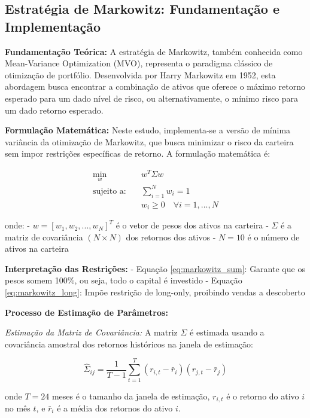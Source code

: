 \subsection{Estratégia de Markowitz: Fundamentação e Implementação}

\textbf{Fundamentação Teórica:} A estratégia de Markowitz, também conhecida como Mean-Variance Optimization (MVO), representa o paradigma clássico de otimização de portfólio. Desenvolvida por Harry Markowitz em 1952, esta abordagem busca encontrar a combinação de ativos que oferece o máximo retorno esperado para um dado nível de risco, ou alternativamente, o mínimo risco para um dado retorno esperado.

\textbf{Formulação Matemática:} Neste estudo, implementa-se a versão de mínima variância da otimização de Markowitz, que busca minimizar o risco da carteira sem impor restrições específicas de retorno. A formulação matemática é:

\begin{align}
\min_{w} \quad & w^T \Sigma w \label{eq:markowitz_obj} \\
\text{sujeito a:} \quad & \sum_{i=1}^{N} w_i = 1 \label{eq:markowitz_sum} \\
& w_i \geq 0 \quad \forall i = 1, ..., N \label{eq:markowitz_long}
\end{align}

onde:
- $w = [w_1, w_2, ..., w_N]^T$ é o vetor de pesos dos ativos na carteira
- $\Sigma$ é a matriz de covariância $(N \times N)$ dos retornos dos ativos
- $N = 10$ é o número de ativos na carteira

\textbf{Interpretação das Restrições:}
- Equação \ref{eq:markowitz_sum}: Garante que os pesos somem 100\%, ou seja, todo o capital é investido
- Equação \ref{eq:markowitz_long}: Impõe restrição de long-only, proibindo vendas a descoberto

\textbf{Processo de Estimação de Parâmetros:}

\textit{Estimação da Matriz de Covariância:} A matriz $\Sigma$ é estimada usando a covariância amostral dos retornos históricos na janela de estimação:

\begin{equation}
\hat{\Sigma}_{ij} = \frac{1}{T-1} \sum_{t=1}^{T} (r_{i,t} - \bar{r}_i)(r_{j,t} - \bar{r}_j)
\end{equation}

onde $T = 24$ meses é o tamanho da janela de estimação, $r_{i,t}$ é o retorno do ativo $i$ no mês $t$, e $\bar{r}_i$ é a média dos retornos do ativo $i$.

